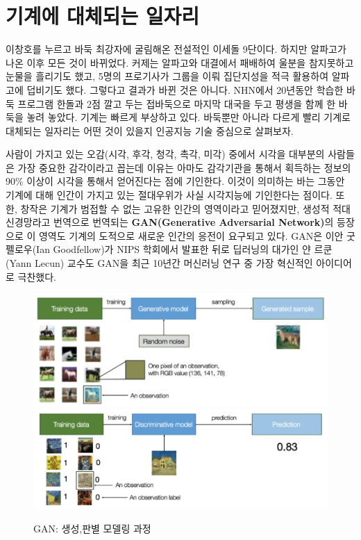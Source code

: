 \documentclass[smallextended]{svjour3}       %
\begin{document}
\hypertarget{challenge-to-human}{%
\section{기계에 대체되는 일자리}\label{challenge-to-human}}

이창호를 누르고 바둑 최강자에 굴림해온 전설적인 이세돌 9단이다. 하지만
알파고가 나온 이후 모든 것이 바뀌었다. 커제는 알파고와 대결에서 패배하여
울분을 참지못하고 눈물을 흘리기도 했고, 5명의 프로기사가 그룹을 이뤄
집단지성을 적극 활용하여 알파고에 덥비기도 했다. 그렇다고 결과가 바뀐
것은 아니다. NHN에서 20년동안 학습한 바둑 프로그램 한돌과 2점 깔고 두는
접바둑으로 마지막 대국\cite{zdnet_2019}을 두고 평생을 함께 한 바둑을
놓려 놓았다.
기계\cite{brynjolfsson2014second, ford2015rise, kaplan2015humans, chang_2017}는
빠르게 부상하고 있다. 바둑뿐만 아니라 다르게 빨리 기계로 대체되는
일자리는 어떤 것이 있을지 인공지능 기술 중심으로 살펴보자.

사람이 가지고 있는 오감(시각, 후각, 청각, 촉각, 미각) 중에서 시각을
대부분의 사람들은 가장 중요한 감각이라고 꼽는데 이유는 아마도 감각기관을
통해서 획득하는 정보의 90\% 이상이 시각을 통해서 얻어진다는 점에
기인한다. 이것이 의미하는 바는 그동안 기계에 대해 인간이 가지고 있는
절대우위가 사실 시각지능에 기인한다는 점이다. 또한, 창작은 기계가 범접할
수 없는 고유한 인간의 영역이라고 믿어졌지만, 생성적 적대 신경망라고
번역으로 번역되는 \textbf{GAN(Generative Adversarial
Network)}\cite{brownlee_2019, hui_2018}의 등장으로 이 영역도 기계의
도적으로 새로운 인간의 응전이 요구되고 있다. GAN은 이안 굿펠로우(Ian
Goodfellow)가 NIPS 학회에서 발표한 뒤로 딥러닝의 대가인 얀 르쿤(Yann
Lecun) 교수도 GAN을 최근 10년간 머신러닝 연구 중 가장 혁신적인
아이디어로 극찬했다.

\begin{figure}

{\centering \includegraphics[width=0.49\linewidth]{fig/generative-model} \includegraphics[width=0.49\linewidth]{fig/discriminative-model} 

}

\caption{GAN: 생성,판별 모델링 과정}\label{fig:unnamed-chunk-2}
\end{figure}
\end{document}
